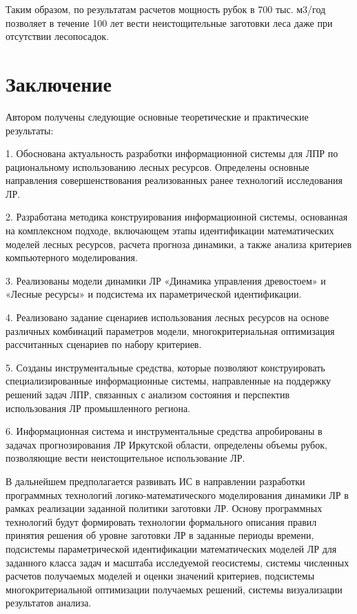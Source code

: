 \documentclass{article}
\begin{document}
Таким образом, по результатам расчетов мощность 
рубок в 700 тыс. м3/год позволяет в течение 100 лет 
вести неистощительные заготовки леса даже 
при отсутствии лесопосадок.\pagebreak{}\label{HToc199746743}

\section*{\textbf{Заключение}}

Автором получены следующие основные теоретические 
и практические результаты:

1. Обоснована актуальность разработки информационной 
системы для ЛПР по рациональному использованию 
лесных ресурсов. Определены основные направления 
совершенствования реализованных ранее технологий 
исследования ЛР. 

2. Разработана методика конструирования информационной 
системы, основанная на комплексном подходе, 
включающем этапы идентификации математических 
моделей лесных ресурсов, расчета прогноза динамики, 
а также анализа критериев компьютерного моделирования.

3. Реализованы модели динамики ЛР «Динамика 
управления древостоем» и «Лесные ресурсы» 
и подсистема их параметрической идентификации.

4. Реализовано задание сценариев использования 
лесных ресурсов на основе различных комбинаций 
параметров модели, многокритериальная оптимизация 
рассчитанных сценариев по набору критериев.

5. Созданы инструментальные средства, которые 
позволяют конструировать специализированные 
информационные системы, направленные на поддержку 
решений задач ЛПР, связанных с анализом состояния 
и перспектив использования ЛР промышленного 
региона.

6. Информационная система и инструментальные 
средства апробированы в задачах прогнозирования 
ЛР Иркутской области, определены объемы рубок, 
позволяющие вести неистощительное использование 
ЛР.

В дальнейшем предполагается развивать ИС в 
направлении разработки программных технологий 
логико-математического моделирования динамики 
ЛР в рамках реализации заданной политики заготовки 
ЛР. Основу программных технологий будут формировать 
технологии формального описания правил принятия 
решения об уровне заготовки ЛР в заданные периоды 
времени, подсистемы параметрической идентификации 
математических моделей ЛР для заданного класса 
задач и масштаба исследуемой геосистемы, системы 
численных расчетов получаемых моделей и оценки 
значений критериев, подсистемы многокритериальной 
оптимизации получаемых решений, системы визуализации 
результатов анализа. \pagebreak{}\label{HToc128995786}\label{HToc199746744}
\end{document}
